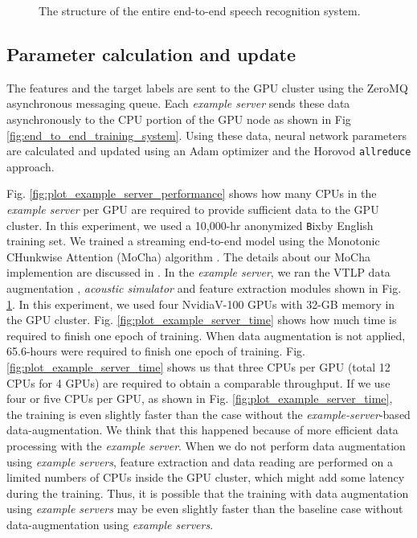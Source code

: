 \documentclass{article}
\begin{document}
\begin{figure}[tbp]
  \begin{center}
    \resizebox{80mm}{!}{}
      \caption {  The structure of the entire end-to-end
      speech recognition system. 
     }
     \label{fig:entire_diagram}
  \end{center}
\vspace{-5mm}
\end{figure}

\subsection{Parameter calculation and update}
\label{sec:parameter_update}
The features and the target labels are sent to the GPU cluster
using the ZeroMQ \cite{zero_mq} asynchronous messaging queue.
Each {\it example server } sends these data asynchronously to the CPU portion
of the GPU node as shown in Fig \ref{fig:end_to_end_training_system}.
Using these data, neural network parameters are calculated and updated 
using an Adam optimizer and the
Horovod \cite{a_sergeev_arxiv_2018_00} {\tt allreduce} approach.

Fig. \ref{fig:plot_example_server_performance} shows how many CPUs
in the {\it  example server } per GPU are required to provide sufficient 
data to the GPU cluster. In this experiment, we used a 10,000-hr
anonymized {\texttt Bixby} English training set. 
We trained a streaming end-to-end model using the Monotonic CHunkwise
Attention (MoCha) algorithm \cite{c_chiu_iclr_2018_00}. The details
about our MoCha implemention are discussed in \cite{k_kim_asru_2019_00}.
In the {\it  example server}, we ran the
VTLP data augmentation \cite{c_kim_interspeech_2019_00}, 
{\it acoustic simulator} \cite{c_kim_interspeech_2017_00} and 
feature extraction modules shown in Fig. \ref{fig:entire_diagram}.
In this experiment, we used four Nvidia\texttrademark V-100 GPUs with 32-GB
memory in the 
GPU cluster. Fig. \ref{fig:plot_example_server_time} shows how much
time is required to finish one epoch of training. When data augmentation
is not applied, 65.6-hours were required to finish one epoch of training.
Fig. \ref{fig:plot_example_server_time} shows us that three CPUs per GPU 
(total 12 CPUs for 4 GPUs) are required to obtain a comparable throughput. 
If we use four or five CPUs per GPU, as shown in Fig.
\ref{fig:plot_example_server_time}, the training is even slightly 
faster than the case without the {\it  example-server}-based data-augmentation.
We think that this happened because of more efficient data processing
with the {\it example server}. When we do not perform data augmentation
using {\it example servers}, feature extraction and data reading are performed
on a limited numbers of CPUs inside the GPU cluster, which might add some
latency during the training. 
Thus, it is possible that the training with data augmentation
using {\it example servers} may be even slightly faster than the 
baseline case without data-augmentation using {\it example servers}.
\end{document}
